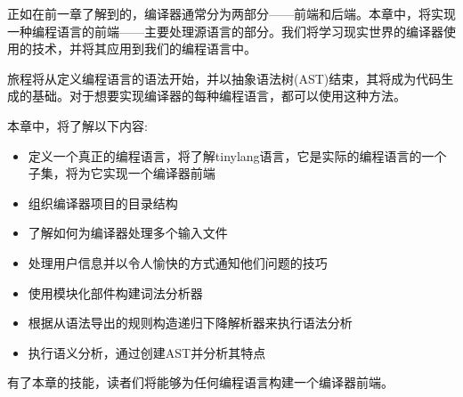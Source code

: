 正如在前一章了解到的，编译器通常分为两部分——前端和后端。本章中，将实现一种编程语言的前端——主要处理源语言的部分。我们将学习现实世界的编译器使用的技术，并将其应用到我们的编程语言中。

旅程将从定义编程语言的语法开始，并以抽象语法树(AST)结束，其将成为代码生成的基础。对于想要实现编译器的每种编程语言，都可以使用这种方法。

本章中，将了解以下内容:

\begin{itemize}
\item
定义一个真正的编程语言，将了解tinylang语言，它是实际的编程语言的一个子集，将为它实现一个编译器前端

\item
组织编译器项目的目录结构

\item
了解如何为编译器处理多个输入文件

\item
处理用户信息并以令人愉快的方式通知他们问题的技巧

\item
使用模块化部件构建词法分析器

\item
根据从语法导出的规则构造递归下降解析器来执行语法分析

\item
执行语义分析，通过创建AST并分析其特点
\end{itemize}

有了本章的技能，读者们将能够为任何编程语言构建一个编译器前端。









